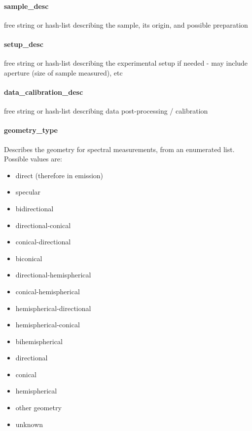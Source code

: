 \documentclass[11pt,a4paper]{ivoa}
\begin{document}
\paragraph{sample\_desc}

free string or hash-list describing the sample, its origin, and possible preparation

\paragraph{setup\_desc}

free string or hash-list describing the experimental setup if needed - may include aperture (size of sample measured), etc

\paragraph{data\_calibration\_desc}

free string or hash-list describing data post-processing / calibration

\paragraph{geometry\_type}

Describes the geometry for spectral measurements, from an enumerated list. Possible values are:

\begin{itemize}
\item direct (therefore in emission)
\item specular
\item bidirectional
\item directional-conical
\item conical-directional
\item biconical
\item directional-hemispherical
\item conical-hemispherical
\item hemispherical-directional
\item hemispherical-conical
\item bihemispherical
\item directional
\item conical
\item hemispherical
\item other geometry
\item unknown
\end{itemize}
\end{document}
